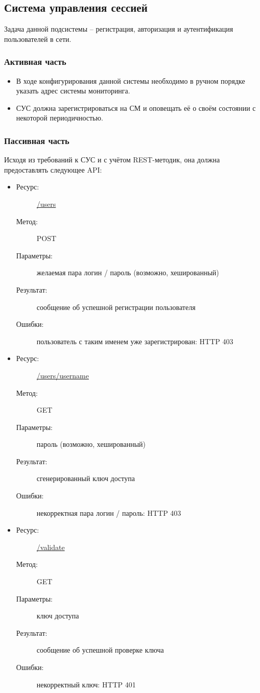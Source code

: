 \documentclass[a4paper,12pt]{report}
\numberwithin{equation}{section}
\begin{document}
\subsection{Система управления сессией}
Задача данной подсистемы -- регистрация, авторизация и аутентификация пользователей в сети.

\subsubsection{Активная часть}
\begin{itemize}
  \item В ходе конфигурирования данной системы необходимо в ручном порядке указать адрес системы мониторинга.
  \item СУС должна зарегистрироваться на СМ и оповещать её о своём состоянии с некоторой периодичностью.
\end{itemize}

\subsubsection{Пассивная часть}
Исходя из требований к СУС и с учётом REST-методик, она должна предоставлять следующее API:

\begin{itemize}
  \item
  \begin{description}
    \item[Ресурс:] \url{/users}
    \item[Метод:] POST
    \item[Параметры:] желаемая пара логин / пароль (возможно, хешированный)
    \item[Результат:] сообщение об успешной регистрации пользователя
    \item[Ошибки:] пользователь с таким именем уже зарегистрирован: HTTP 403
  \end{description}
  \item
  \begin{description}
    \item[Ресурс:] \url{/users/username}
    \item[Метод:] GET
    \item[Параметры:] пароль (возможно, хешированный)
    \item[Результат:] сгенерированный ключ доступа
    \item[Ошибки:] некорректная пара логин / пароль: HTTP 403
  \end{description}
  \item
  \begin{description}
    \item[Ресурс:] \url{/validate}
    \item[Метод:] GET
    \item[Параметры:] ключ доступа
    \item[Результат:] сообщение об успешной проверке ключа
    \item[Ошибки:] некорректный ключ: HTTP 401
  \end{description}
\end{itemize}
\end{document}
